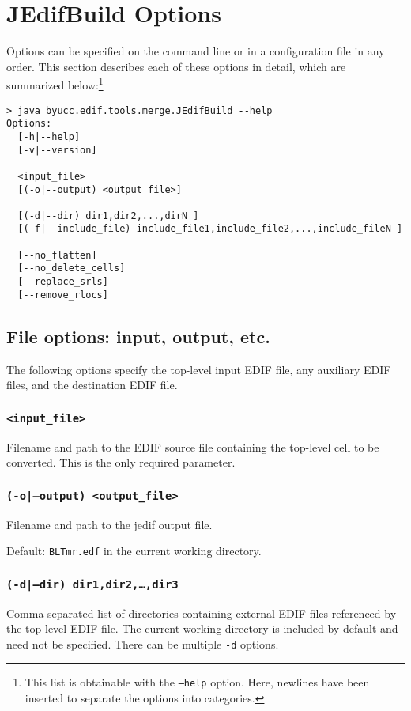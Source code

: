 \section{JEdifBuild Options}
Options can be specified on the command line or in a configuration file in any 
order. This section describes each of these options in detail, which are 
summarized below:\footnote{This list is obtainable with the \texttt{--help} 
option. Here, newlines have been inserted to separate the options into 
categories.}

\begin{verbatim}
> java byucc.edif.tools.merge.JEdifBuild --help
Options:
  [-h|--help]
  [-v|--version]

  <input_file>
  [(-o|--output) <output_file>]

  [(-d|--dir) dir1,dir2,...,dirN ]
  [(-f|--include_file) include_file1,include_file2,...,include_fileN ]

  [--no_flatten]
  [--no_delete_cells]
  [--replace_srls]
  [--remove_rlocs]

\end{verbatim}

\subsection{File options: input, output, etc.}
The following options specify the top-level input EDIF file, any auxiliary EDIF
files, and the destination EDIF file.

\subsubsection{\texttt{<input\_file>}}
Filename and path to the EDIF source file containing the top-level cell to be 
converted. This is the only required parameter.

\subsubsection{\texttt{(-o|--output) <output\_file>}}
Filename and path to the jedif output file.

Default: \texttt{BLTmr.edf} in the current working directory.

\subsubsection{\texttt{(-d|--dir) dir1,dir2,\ldots,dir3}}
Comma-separated list of directories containing external EDIF files referenced 
by the top-level EDIF file. The current working directory is included by 
default and need not be specified. There can be multiple \texttt{-d} options.

